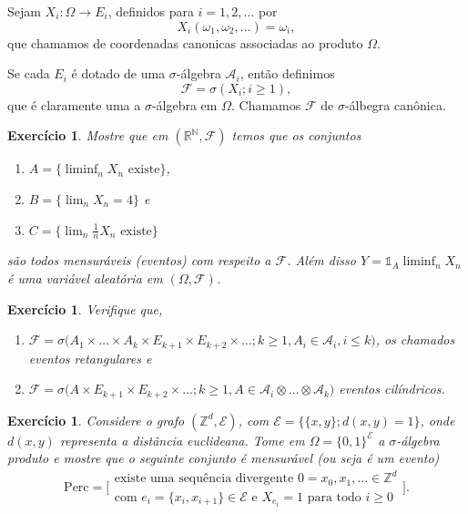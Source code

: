 \documentclass[reqno]{article}
\newcommand*\1{\mathds{1}}
\newtheorem{exercise}[example]{Exercício}
\begin{document}
Sejam $X_i:\Omega \to E_i$, definidos para $i = 1, 2, \dots$ por
\begin{equation}
  X_i(\omega_1, \omega_2, \dots) = \omega_i,
\end{equation}
que chamamos de coordenadas canonicas associadas ao produto $\Omega$.

Se cada $E_i$ é dotado de uma $\sigma$-álgebra $\mathcal{A}_i$, então definimos
\begin{equation}
  \mathcal{F} = \sigma(X_i; i \geq 1),
\end{equation}
que é claramente uma a $\sigma$-álgebra em $\Omega$.
Chamamos $\mathcal{F}$ de $\sigma$-álbegra canônica.

\begin{exercise}
  Mostre que em $(\mathbb{R}^{\mathbb{N}},\mathcal{F})$ temos que os conjuntos
  \begin{enumerate}
  \item $A = \{ \liminf_n X_n \text{ existe}\}$,
  \item $B = \{ \lim_n X_n = 4\}$ e
  \item $C = \{ \lim_n \tfrac{1}{n} X_n \text{ existe}\}$
  \end{enumerate}
  são todos mensuráveis (eventos) com respeito a $\mathcal{F}$.
  Além disso $Y = \1_A \liminf_n X_n$ é uma variável aleatória em $(\Omega, \mathcal{F})$.
\end{exercise}

\begin{exercise}
  Verifique que,
  \begin{enumerate}
  \item $\mathcal{F} = \sigma\big(A_1 \times \dots \times A_k \times E_{k+1} \times E_{k+2} \times \dots; k \geq 1, A_i \in \mathcal{A}_i, i \leq k\big)$, os chamados eventos retangulares e
  \item $\mathcal{F} = \sigma\big(A \times E_{k+1} \times E_{k+2} \times \dots; k \geq 1, A \in \mathcal{A}_i \otimes \dots \otimes \mathcal{A}_k\big)$ eventos cilíndricos.
  \end{enumerate}
\end{exercise}

\begin{exercise}
  Considere o grafo $(\mathbb{Z}^d, \mathcal{E})$, com $\mathcal{E} = \{ \{x,y\}; d(x,y) = 1 \}$, onde $d(x,y)$ representa a distância euclideana.
  Tome em $\Omega = \{0,1\}^\mathcal{E}$ a $\sigma$-álgebra produto e mostre que o seguinte conjunto é mensurável (ou seja é um evento)
  \begin{equation}
    \text{Perc} = \Big[
    \begin{array}{c}
      \text{existe uma sequência divergente $0 = x_0, x_1, \dots \in \mathbb{Z}^d$}\\
      \text{com $e_i = \{x_i, x_{i+1}\} \in \mathcal{E}$ e $X_{e_i} = 1$ para todo $i \geq 0$}
    \end{array}
\Big].
  \end{equation}
\end{exercise}
\end{document}
